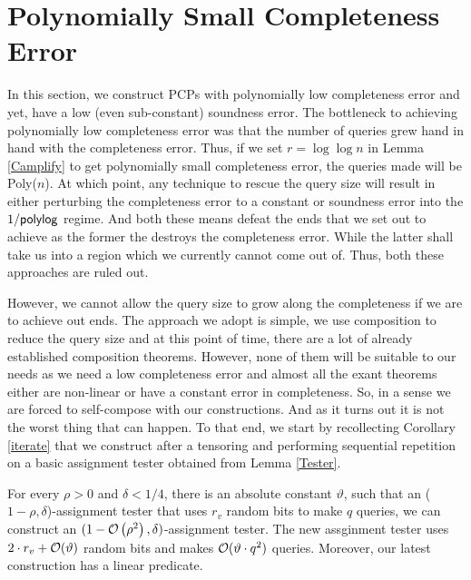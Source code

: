 \section{Polynomially Small Completeness Error}\label{section:Iterated}

In this section, we construct PCPs with polynomially low completeness
error and yet, have a low (even sub-constant) soundness error. The
bottleneck to achieving polynomially low completeness error was that
the number of queries grew hand in hand with the completeness
error. Thus, if we set $r = \log \log n$ in Lemma \ref{Camplify} to
get polynomially small completeness error, the queries made will be
{\sf Poly}($n$). At which point, any technique to rescue the query
size will result in either perturbing the completeness error to a
constant or soundness error into the $1/{\sf polylog}$ regime. And
both these means defeat the ends that we set out to achieve as the
former the destroys the completeness error. While the latter shall
take us into a region which we currently cannot come out of. Thus,
both these approaches are ruled out.

However, we cannot allow the query size to grow along the completeness
if we are to achieve out ends. The approach we adopt is simple, we use
composition to reduce the query size and at this point of time, there
are a lot of already established composition theorems. However, none
of them will be suitable to our needs as we need a low completeness
error and almost all the exant theorems either are non-linear or have
a constant error in completeness. So, in a sense we are forced to
self-compose with our constructions. And as it turns out it is not the
worst thing that can happen. To that end, we start by recollecting
Corollary \ref{iterate} that we construct after a tensoring and
performing sequential repetition on a basic assignment tester obtained
from Lemma \ref{Tester}.

\begin{col}
  For every $\rho > 0$ and $\delta < 1/4$, there is an absolute constant
  $\vartheta$, such that an ($1 - \rho, \delta$)-assignment tester
  that uses $r_v$ random bits to make $q$ queries, we can construct an
  $(1 - {\cal O}\left(\rho^2\right) , {\delta})$-assignment
  tester. The new assginment tester uses $2 \cdot r_v + {\cal
    O}(\vartheta)$ random bits and makes ${\cal O}(\vartheta \cdot
  q^2)$ queries. Moreover, our latest construction has a linear
  predicate.
 \end{col}



